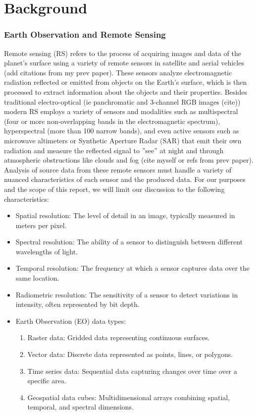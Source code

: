 \section{Background}

\begin{multicols}{2}

\subsubsection{Earth Observation and Remote Sensing}

Remote sensing (RS) refers to the process of acquiring images and data of the planet's surface using a variety of remote sensors in satellite and aerial vehicles (add citations from my prev paper). 
These sensors analyze electromagnetic radiation reflected or emitted from objects on the Earth's surface, which is then processed to extract information about the objects and their properties. 
Besides traditional electro-optical (ie panchromatic and 3-channel RGB images (cite)) modern RS employs a variety of sensors and modalities such as multispectral 
(four or more non-overlapping bands in the electromagnetic spectrum), hyperspectral (more than 100 narrow bands), and even active sensors such as microwave altimeters or Synthetic
Aperture Radar (SAR) that emit their own radiation and measure the reflected signal to ”see” at night and through atmospheric obstructions like clouds and fog (cite myself or refs from prev paper). 
Analysis of source data from these remote sensors must handle a variety of nuanced characteristics of each sensor and the produced data. For our purposes and the scope of this report, we will limit our discussion
to the following characteristics: 

\begin{itemize}
    \item Spatial resolution: The level of detail in an image, typically measured in meters per pixel.
    \item Spectral resolution: The ability of a sensor to distinguish between different wavelengths of light.
    \item Temporal resolution: The frequency at which a sensor captures data over the same location.
    \item Radiometric resolution: The sensitivity of a sensor to detect variations in intensity, often represented by bit depth.
    \item Earth Observation (EO) data types:
        \begin{enumerate}
            \item Raster data: Gridded data representing continuous surfaces.
            \item Vector data: Discrete data represented as points, lines, or polygons.
            \item Time series data: Sequential data capturing changes over time over a specific area.
            \item Geospatial data cubes: Multidimensional arrays combining spatial, temporal, and spectral dimensions.
        \end{enumerate}
\end{itemize}


\end{multicols}
